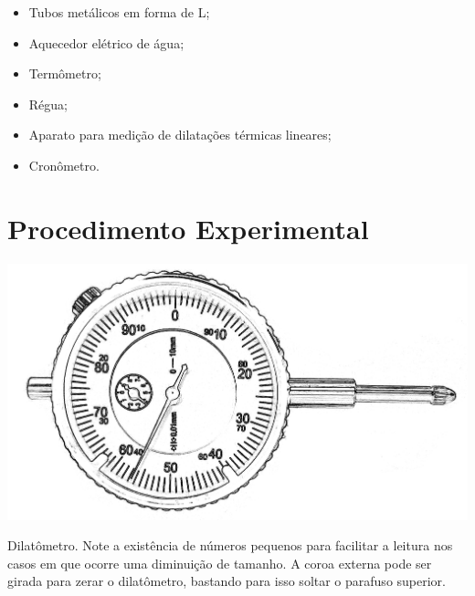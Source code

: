 \begin{itemize}
	\item Tubos metálicos em forma de L;
	\item Aquecedor elétrico de água;
	\item Termômetro;
	\item Régua;
	\item Aparato para medição de dilatações térmicas lineares;
	\item Cronômetro.
\end{itemize}

\section{Procedimento Experimental}
\begin{marginfigure}
	\includegraphics[width=\textwidth]{Ilustrations/Dilatometro.png}
	\caption{Dilatômetro. Note a existência de números pequenos para facilitar a leitura nos casos em que ocorre uma diminuição de tamanho. A coroa externa pode ser girada para zerar o dilatômetro, bastando para isso soltar o parafuso superior.}
\end{marginfigure}

